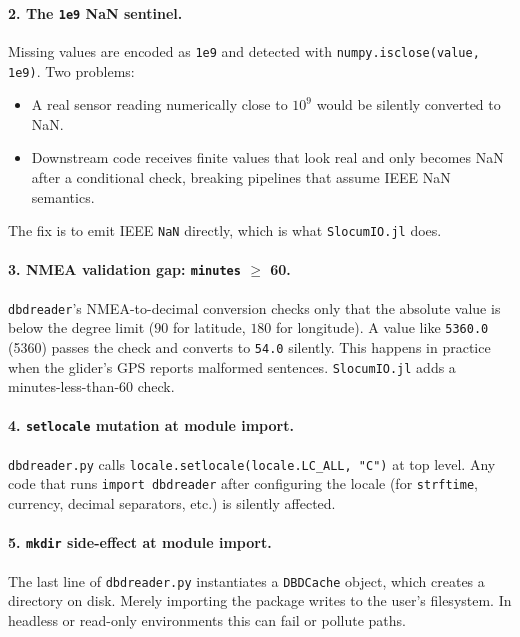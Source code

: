\documentclass[11pt]{article}
\begin{document}
\paragraph{2. The \texttt{1e9} NaN sentinel.}
Missing values are encoded as \texttt{1e9} and detected with
\texttt{numpy.isclose(value, 1e9)}.  Two problems:
\begin{itemize}[leftmargin=*,topsep=1pt,itemsep=0pt]
  \item A real sensor reading numerically close to $10^9$ would be
        silently converted to NaN.
  \item Downstream code receives finite values that look real and only
        becomes NaN after a conditional check, breaking pipelines that
        assume IEEE NaN semantics.
\end{itemize}
The fix is to emit IEEE \texttt{NaN} directly, which is what
\texttt{SlocumIO.jl} does.

\paragraph{3. NMEA validation gap: \texttt{minutes} $\geq$ 60.}
\texttt{dbdreader}'s NMEA-to-decimal conversion checks only that the
absolute value is below the degree limit ($90$ for latitude, $180$ for
longitude).  A value like \texttt{5360.0} (53\textdegree{}60\textquotesingle) passes the
check and converts to \texttt{54.0\textdegree{}} silently.  This happens in
practice when the glider's GPS reports malformed sentences.
\texttt{SlocumIO.jl} adds a minutes-less-than-60 check.

\paragraph{4. \texttt{setlocale} mutation at module import.}
\texttt{dbdreader.py} calls \texttt{locale.setlocale(locale.LC\_ALL, "C")}
at top level.  Any code that runs \texttt{import dbdreader} after
configuring the locale (for \texttt{strftime}, currency, decimal
separators, etc.) is silently affected.

\paragraph{5. \texttt{mkdir} side-effect at module import.}
The last line of \texttt{dbdreader.py} instantiates a \texttt{DBDCache} object,
which creates a directory on disk.  Merely importing the package writes to
the user's filesystem.  In headless or read-only environments this can
fail or pollute paths.
\end{document}

